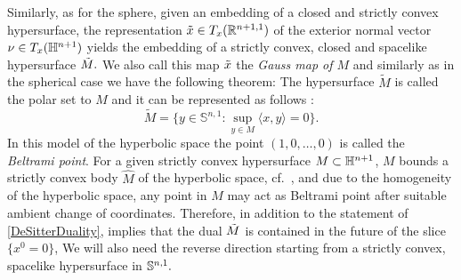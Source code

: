 Similarly, as for the sphere, given an embedding
of a closed and strictly convex hypersurface, the representation $\~x\in T_x(\R^{n+1,1})$ of the exterior normal vector $\nu\in T_x(\H^{n+1})$ yields the embedding
of a strictly convex, closed and spacelike hypersurface $\~M.$
We also call this map $\~x$ the {\it{Gauss map of $M$}} and similarly as in the spherical case we have the following theorem:
The hypersurface $\tilde{M}$ is called the polar set to $M$ and it can be represented as follows \cite[Thm.~10.4.8]{Gerhardt:/2006}:
$$\tilde{M}=\{y\in \mathbb{S}^{n,1}: \sup_{y\in M}\langle x,y\rangle=0\}.$$
In this model of the hyperbolic space the point $(1,0,\ldots,0)$ is called the {\it{Beltrami point}}. For a given strictly convex hypersurface $M\sub\H^{n+1}$, $M$ bounds a strictly convex body $\hat{M}$ of the hyperbolic space, cf.~\cite[Thm.~10.3.1]{Gerhardt:/2006}, and due to the homogeneity of the hyperbolic space, any point in $\hat{M}$ may act as Beltrami point after suitable ambient change of coordinates. Therefore, in addition to the statement of \cref{DeSitterDuality}, \cite[Thm.~10.4.9.]{Gerhardt:/2006} implies that the dual $\~M$ is contained in the future of the slice $\{x^0=0\}$,
We will also need the reverse direction starting from a strictly convex, spacelike hypersurface in $\S^{n,1}.$
